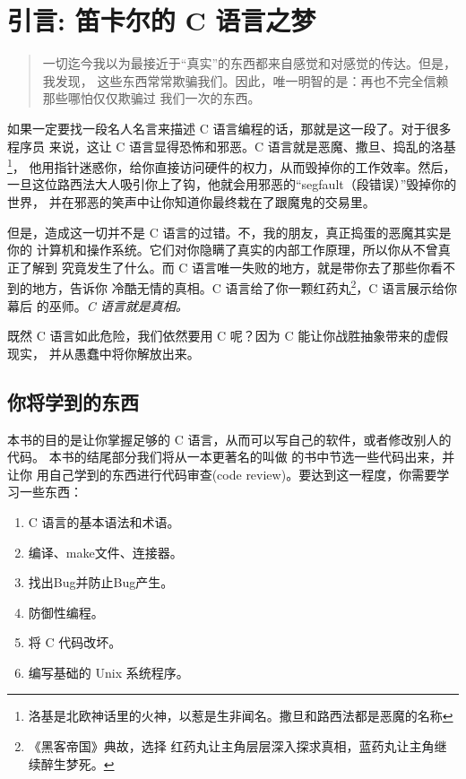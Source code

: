 \chapter*{引言: 笛卡尔的 C 语言之梦}

\begin{quotation}

一切迄今我以为最接近于“真实”的东西都来自感觉和对感觉的传达。但是，我发现，
这些东西常常欺骗我们。因此，唯一明智的是：再也不完全信赖那些哪怕仅仅欺骗过
我们一次的东西。

\end{quotation}

如果一定要找一段名人名言来描述 C 语言编程的话，那就是这一段了。对于很多程序员
来说，这让 C 语言显得恐怖和邪恶。C 语言就是恶魔、撒旦、捣乱的洛基\footnote
[译注1]{洛基是北欧神话里的火神，以惹是生非闻名。撒旦和路西法都是恶魔的名称}，
他用指针迷惑你，给你直接访问硬件的权力，从而毁掉你的工作效率。然后，
一旦这位路西法大人吸引你上了钩，他就会用邪恶的“segfault（段错误）”毁掉你的世界，
并在邪恶的笑声中让你知道你最终栽在了跟魔鬼的交易里。

但是，造成这一切并不是 C 语言的过错。不，我的朋友，真正捣蛋的恶魔其实是你的
计算机和操作系统。它们对你隐瞒了真实的内部工作原理，所以你从不曾真正了解到
究竟发生了什么。而 C 语言唯一失败的地方，就是带你去了那些你看不到的地方，告诉你
冷酷无情的真相。C 语言给了你一颗红药丸\footnote[译注2]{《黑客帝国》典故，选择
红药丸让主角层层深入探求真相，蓝药丸让主角继续醉生梦死。}，C 语言展示给你幕后
的巫师。\emph{C 语言就是真相。}

既然 C 语言如此危险，我们依然要用 C 呢？因为 C 能让你战胜抽象带来的虚假现实，
并从愚蠢中将你解放出来。

\section*{你将学到的东西}

本书的目的是让你掌握足够的 C 语言，从而可以写自己的软件，或者修改别人的代码。
本书的结尾部分我们将从一本更著名的叫做 \krc 的书中节选一些代码出来，并让你
用自己学到的东西进行代码审查(code review)。要达到这一程度，你需要学习一些东西：

\begin{enumerate}
\item C 语言的基本语法和术语。
\item 编译、make文件、连接器。
\item 找出Bug并防止Bug产生。
\item 防御性编程。
\item 将 C 代码改坏。
\item 编写基础的 Unix 系统程序。
\end{enumerate}

